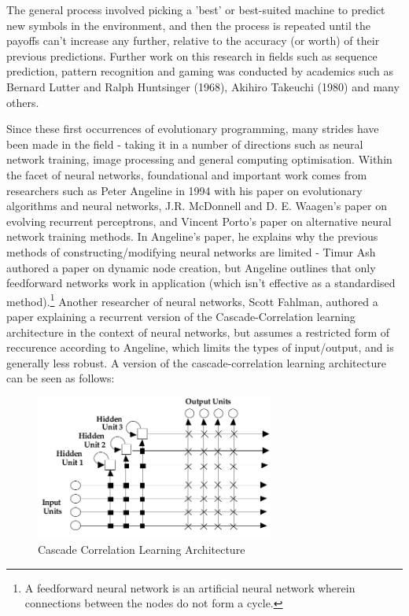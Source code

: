 \documentclass[12pt,a4paper]{article}
\begin{document}
\noindent
The general process involved picking a 'best' or best-suited machine to predict new symbols in the environment, and then the process is repeated until the payoffs can't increase any further, relative to the accuracy (or worth) of their previous predictions. Further work on this research in fields such as sequence prediction, pattern recognition and gaming was conducted by academics such as Bernard Lutter and Ralph Huntsinger (1968), Akihiro Takeuchi (1980) and many others.

\noindent
Since these first occurrences of evolutionary programming, many strides have been made in the field - taking it in a number of directions such as neural network training, image processing and general computing optimisation. Within the facet of neural networks, foundational and important work comes from researchers such as Peter Angeline in 1994 with his paper on evolutionary algorithms and neural networks, J.R. McDonnell and D. E. Waagen's paper on evolving recurrent perceptrons, and Vincent Porto's paper on alternative neural network training methods. In Angeline's paper, he explains why the previous methods of constructing/modifying neural networks are limited - Timur Ash authored a paper on dynamic node creation, but Angeline outlines that only feedforward networks work in application (which isn't effective as a standardised method).\footnote{A feedforward neural network is an artificial neural network wherein connections between the nodes do not form a cycle.} Another researcher of neural networks, Scott Fahlman, authored a paper explaining a recurrent version of the Cascade-Correlation learning architecture in the context of neural networks, but assumes a restricted form of reccurence according to Angeline, which limits the types of input/output, and is generally less robust. A version of the cascade-correlation learning architecture can be seen as follows: \\

\noindent
\begin{figure}[H]
	\centering
		\includegraphics[width=0.7\textwidth]{CascadeCorrelationLearningArchitecture}
		\caption{Cascade Correlation Learning Architecture}
\end{figure}
\end{document}
